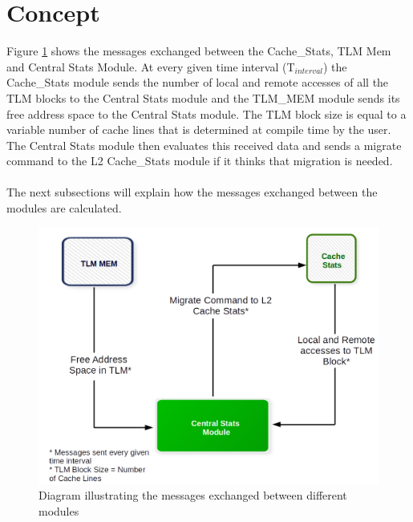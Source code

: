 \documentclass{listhesis}
\begin{document}
\section{Concept}
Figure \ref{fig:approachOfSolution} shows the messages exchanged between the Cache{\_}Stats, TLM Mem and Central Stats Module. At every given time interval (T$_{interval}$) the Cache{\_}Stats module sends the number of local and remote accesses of all the TLM blocks to the Central Stats module and the TLM{\_}MEM module sends its free address space to the Central Stats module. The TLM block size is equal to a variable number of cache lines that is determined at compile time by the user. The Central Stats module then evaluates this received data and sends a migrate command to the L2 Cache{\_}Stats module if it thinks that migration is needed. \\
\\
The next subsections will explain how the messages exchanged between the modules are calculated. 
\begin{figure}
  \includegraphics[width=0.7\linewidth]{approachOfSolution.png}
  \centering
  \caption{Diagram illustrating the messages exchanged between different modules}
  \label{fig:approachOfSolution}
\end{figure}
\end{document}
